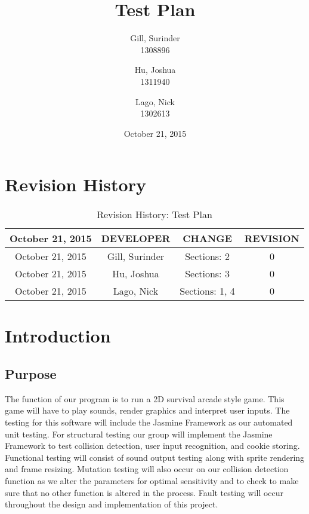 \documentclass[11pt, oneside]{article}   	%
\title{Test Plan}
\author{Gill, Surinder\\
		1308896
		\and
		Hu, Joshua\\
		1311940
		\and
		Lago, Nick\\
		1302613}
\date{October 21, 2015}							%
\begin{document}
\maketitle

\newpage
\section{Revision History}

\begin{table}[H]
\caption{Revision History: Test Plan}
\begin{center}
\label{tab:}
\begin{tabular}{|c|c|c|c|}
\hline
\textbf{October 21, 2015} & \textbf{DEVELOPER} & \textbf{CHANGE} & \textbf{REVISION}\\
\hline
October 21, 2015 & Gill, Surinder & Sections: 2 & 0\\
\hline
October 21, 2015 & Hu, Joshua & Sections: 3 & 0\\
\hline
October 21, 2015 & Lago, Nick & Sections: 1, 4 & 0\\
\hline
\end{tabular}
\end{center}
\label{default}
\end{table}

\newpage
\tableofcontents
\listoffigures
\listoftables

\newpage
\section{Introduction}
\subsection{Purpose}
The function of our program is to run a 2D survival arcade style game. This game will have to play sounds, render graphics and interpret user inputs. The testing for this software will include the Jasmine Framework as our automated unit testing. For structural testing our group will implement the Jasmine Framework to test collision detection, user input recognition, and cookie storing.  Functional testing will consist of sound output testing along with sprite rendering and frame resizing. Mutation testing will also occur on our collision detection function as we alter the parameters for optimal sensitivity and to check to make sure that no other function is altered in the process. Fault testing will occur throughout the design and implementation of this project.
\end{document}
